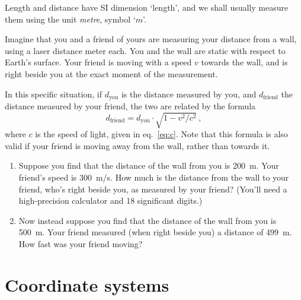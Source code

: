 \documentclass[a4paper,12pt,%
onecolumn,oneside,%
british%
]{memoir}
\renewcommand*{\|}[1][]{\nonscript\:#1\vert\nonscript\:\mathopen{}}
\newcommand*{\eqn}{eq.}%
\newcommand*{\yc}{c} %
\begin{document}
\medskip

Length and distance have SI dimension \enquote*{\textsf{length}}, and we shall usually measure them using the unit \emph{metre}, symbol \enquote*{$\unit{m}$}.

\begin{exercise}[label={ex:distance}]
  Imagine that you and a friend of yours are measuring your distance from a wall, using a laser distance meter each. You and the wall are static with respect to Earth's surface. Your friend is moving with a speed $v$ towards the wall, and is right beside you at the exact moment of the measurement.

  \smallskip

  In this specific situation, if $d_{\textrm{you}}$ is the distance measured by you, and $d_{\textrm{friend}}$ the distance measured by your friend, the two are related by the formula
  \begin{equation*}
    d_{\textrm{friend}} = d_{\textrm{you}} \cdot \sqrt{1 - v^{2}/\yc^{2}} \ ,
  \end{equation*}
  where $\yc$ is the speed of light, given in \eqn~\eqref{eq:c}. Note that this formula is also valid if your friend is moving away from the wall, rather than towards it.

\begin{enumerate}[exerc]
\item\label{item:distance_friend} Suppose you find that the distance of the wall from you is \qty{200}{m}. Your friend's speed is \qty{300}{m/s}. How much is the distance from the wall to your friend, who's right beside you, as measured by your friend? (You'll need a high-precision calculator and 18 significant digits.)

\item\label{item:velocity_friend} Now instead suppose you find that the distance of the wall from you is \qty{500}{m}. Your friend measured (when right beside you) a distance of \qty{499}{m}. How fast was your friend moving?
\end{enumerate}
\end{exercise}

\section{Coordinate systems}
\label{sec:coords}
\end{document}
